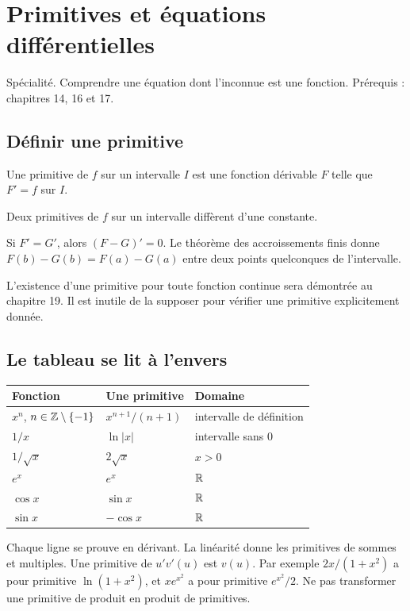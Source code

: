 \documentclass[../cours_tle.tex]{subfiles}
\begin{document}
\setcounter{chapter}{17}
\chapter{Primitives et équations différentielles}
\label{ch:18}
\begin{objectif}
Spécialité. Comprendre une équation dont l'inconnue est une fonction. Prérequis : chapitres 14, 16 et 17.
\end{objectif}
\section{Définir une primitive}
Une primitive de $f$ sur un intervalle $I$ est une fonction dérivable $F$ telle que $F'=f$ sur $I$.
\begin{theoreme}
Deux primitives de $f$ sur un intervalle diffèrent d'une constante.
\end{theoreme}
\begin{demonstration}
Si $F'=G'$, alors $(F-G)'=0$. Le théorème des accroissements finis donne $F(b)-G(b)=F(a)-G(a)$ entre deux points quelconques de l'intervalle.
\end{demonstration}
L'existence d'une primitive pour toute fonction continue sera démontrée au chapitre 19. Il est inutile de la supposer pour vérifier une primitive explicitement donnée.
\section{Le tableau se lit à l'envers}
\begin{center}
\begin{tabular}{lll}\toprule
Fonction & Une primitive & Domaine\\\midrule
$x^n$, $n\in\mathbb{Z}\setminus\{-1\}$ & $x^{n+1}/(n+1)$ & intervalle de définition\\
$1/x$ & $\ln|x|$ & intervalle sans $0$\\
$1/\sqrt x$ & $2\sqrt x$ & $x>0$\\
$e^x$ & $e^x$ & $\mathbb{R}$\\
$\cos x$ & $\sin x$ & $\mathbb{R}$\\
$\sin x$ & $-\cos x$ & $\mathbb{R}$\\\bottomrule
\end{tabular}
\end{center}
Chaque ligne se prouve en dérivant. La linéarité donne les primitives de sommes et multiples. Une primitive de $u'v'(u)$ est $v(u)$.
Par exemple $2x/(1+x^2)$ a pour primitive $\ln(1+x^2)$, et $xe^{x^2}$ a pour primitive $e^{x^2}/2$.
Ne pas transformer une primitive de produit en produit de primitives.
\end{document}
